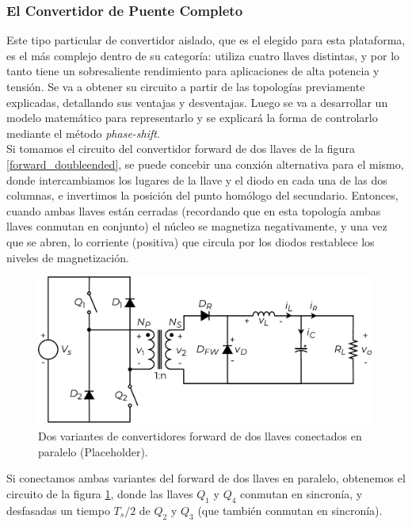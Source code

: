 \subsubsection{El Convertidor de Puente Completo}

Este tipo particular de convertidor aislado, que es el elegido para esta plataforma, es el más complejo dentro de su categoría: utiliza cuatro llaves distintas, y por lo tanto tiene un sobresaliente rendimiento para aplicaciones de alta potencia y tensión. Se va a obtener su circuito a partir de las topologías previamente explicadas, detallando sus ventajas y desventajas. Luego se va a desarrollar un modelo matemático para representarlo y se explicará la forma de controlarlo mediante el método \textit{phase-shift}.\\

Si tomamos el circuito del convertidor forward de dos llaves de la figura \ref{forward_doubleended}, se puede concebir una conxión alternativa para el mismo, donde intercambiamos los lugares de la llave y el diodo en cada una de las dos columnas, e invertimos la posición del punto homólogo del secundario. Entonces, cuando ambas llaves están cerradas (recordando que en esta topología ambas llaves conmutan en conjunto) el núcleo se magnetiza negativamente, y una vez que se abren, lo corriente (positiva) que circula por los diodos restablece los niveles de magnetización.\\

\begin{figure}[h]
    \centering
    \includegraphics[scale=0.6]{Imagenes/Forward Double-Ended.pdf}
    \caption{Dos variantes de convertidores forward de dos llaves conectados en paralelo (Placeholder).}
    \label{desarrollo_fullbridge}
\end{figure}

Si conectamos ambas variantes del forward de dos llaves en paralelo, obtenemos el circuito de la figura \ref{desarrollo_fullbridge}, donde las llaves $Q_1$ y $Q_4$ conmutan en sincronía, y desfasadas un tiempo $T_s/2$ de $Q_2$ y $Q_3$ (que también conmutan en sincronía).\\

